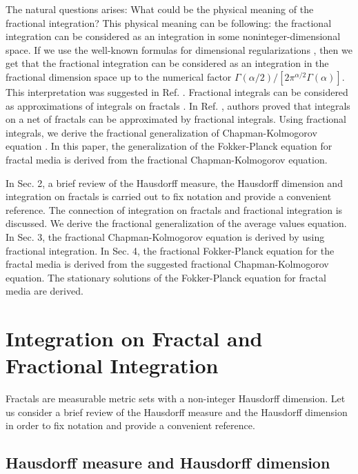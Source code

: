 \documentclass[12pt]{article}
\begin{document}
The natural questions arises: What could be the physical
meaning of the fractional integration?
This physical meaning can be following:
the fractional integration can be considered as an
integration in some noninteger-dimensional space.
If we use the well-known formulas for dimensional 
regularizations \cite{Col}, then we get
that the fractional integration can be considered as an 
integration in the fractional dimension space \cite{nonHam}
up to the numerical factor
$\Gamma(\alpha/2) /[ 2 \pi^{\alpha/2} \Gamma(\alpha)]$.
This interpretation was suggested in Ref. \cite{nonHam}.
Fractional integrals can be considered as approximations 
of integrals on fractals \cite{Svozil,RLWQ}. 
In Ref. \cite{RLWQ}, authors proved that integrals
on a net of fractals can be approximated by fractional integrals.
Using fractional integrals, we derive the fractional generalization 
of Chapman-Kolmogorov equation \cite{Kolm1,Kolm2}. 
In this paper, the generalization of the Fokker-Planck equation 
for fractal media
is derived from the fractional Chapman-Kolmogorov equation. 

In Sec. 2, a brief review of 
the Hausdorff measure, the Hausdorff dimension 
and integration on fractals is carried out 
to fix notation and provide a convenient reference.
The connection of integration on fractals and fractional 
integration is discussed.
We derive the fractional generalization of the average values equation.
In Sec. 3, the fractional Chapman-Kolmogorov equation
is derived by using fractional integration. 
In Sec. 4, the fractional Fokker-Planck equation for the fractal media 
is derived from the suggested fractional Chapman-Kolmogorov equation. 
The stationary solutions of the Fokker-Planck equation
for fractal media are derived. 




\section{Integration on Fractal and Fractional Integration} 

Fractals are measurable metric sets 
with a non-integer Hausdorff dimension.  
Let us consider a brief review of 
the Hausdorff measure and the Hausdorff dimension  
in order to fix notation and provide a convenient reference. 

\subsection{Hausdorff measure and Hausdorff dimension}
\end{document}
